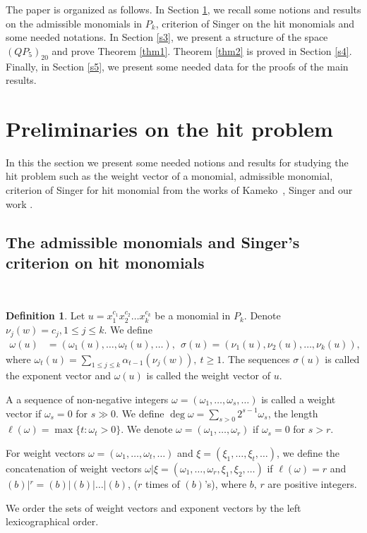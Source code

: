 \documentclass[reqno]{amsart}
\theoremstyle{plain}
\theoremstyle{definition}
\theoremstyle{plain}
\theoremstyle{definition}
\newtheorem{defns}[thms]{Definition}
\numberwithin{equation}{section}
\begin{document}
\smallskip
The paper is organized as follows. In Section \ref{s2}, we recall some notions and results on the admissible monomials in $P_k$, criterion of Singer on the hit monomials and some needed notations. In Section \ref{s3}, we present a structure of the space $(QP_5)_{20}$ and prove Theorem \ref{thm1}. Theorem \ref{thm2} is proved in Section \ref{s4}. Finally, in Section \ref{s5}, we present some needed data for the proofs of the main results.


\section{Preliminaries on the hit problem}\label{s2}
\setcounter{equation}{0}

In this the section we present some needed notions and results for studying the hit problem such as the weight vector of a monomial, admissible monomial, criterion of Singer for hit monomial from the works of Kameko~\cite{ka}, Singer \cite{si2} and our work \cite{su1,su5}.


\subsection{The admissible monomials and Singer's criterion on hit monomials}\

\medskip
\begin{defns} Let $u =x_1^{c_1}x_2^{c_2}\ldots x_k^{c_k}$ be a monomial  in $P_k$. Denote $\nu_j(w) = c_j, 1 \leqslant j \leqslant k$. We define 
\begin{align*} 
\omega(u)&=(\omega_1(u),\ldots , \omega_t(u), \ldots),\ \
\sigma(u) = (\nu_1(u),\nu_2(u),\ldots ,\nu_k(u)),
\end{align*}
where $\omega_t(u) = \sum_{1\leqslant j \leqslant k} \alpha_{t-1}(\nu_j(w)),\ t \geqslant 1.$
The sequences $\sigma(u)$ is called the exponent vector and $\omega(u)$ is called the weight vector of $u$.  
	
A a sequence of non-negative integers $\omega= (\omega_1,\ldots , \omega_s, \ldots)$ is called a weight vector if $\omega_s = 0$ for $s \gg 0$. We define $\deg \omega = \sum_{s > 0}2^{s-1}\omega_s$, the length $\ell(\omega) = \max\{t : \omega_t >0\}$. We denote $\omega= (\omega_1,\ldots , \omega_r)$ if $\omega_s = 0$ for $s > r$.
	
For weight vectors $\omega= (\omega_1,\ldots , \omega_t, \ldots)$ and $\xi= (\xi_1,\ldots , \xi_t, \ldots)$, we define the concatenation of weight vectors $\omega|\xi = (\omega_1,\ldots , \omega_r,\xi_1,\xi_2,\ldots)$ if $\ell(\omega) = r$ and $(b)|^r = (b)|(b)|\ldots|(b)$, ($r$ times of $(b)$'s), where $b,\, r$ are positive integers.
\end{defns}
We order the sets of weight vectors and exponent vectors by the left lexicographical order.  
\end{document}
